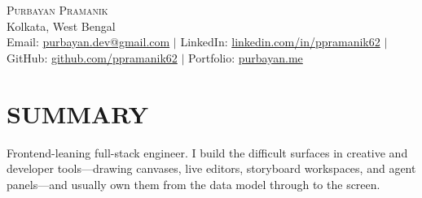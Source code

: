 \documentclass[letterpaper, 10pt]{article}
\begin{document}

  \begin{center}
    {\Huge \scshape Purbayan Pramanik} \\
    \vspace{1pt}
    Kolkata, West Bengal \\
    \vspace{1pt}
    \footnotesize Email: \href{mailto:purbayan.dev@gmail.com}{purbayan.dev@gmail.com} $|$ LinkedIn: \href{https://linkedin.com/in/ppramanik62}{linkedin.com/in/ppramanik62} $|$ GitHub: \href{https://github.com/ppramanik62}{github.com/ppramanik62} $|$ Portfolio: \href{https://purbayan.me}{purbayan.me}
  \end{center}
  \vspace{-2pt}

  \section{SUMMARY}
  \vspace{-1pt}
  \small{Frontend-leaning full-stack engineer. I build the difficult surfaces in creative and developer tools---drawing canvases, live editors, storyboard workspaces, and agent panels---and usually own them from the data model through to the screen.}
  \vspace{-8pt}

\end{document}
